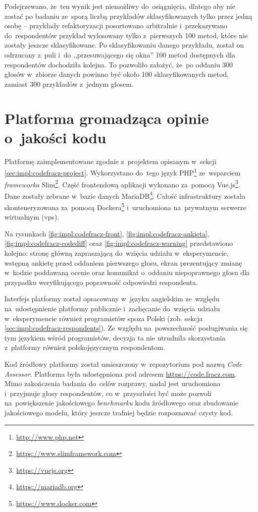\documentclass[twoside]{praca}
\begin{document}
Podejrzewano, że~ten wynik jest niemożliwy do~osiągnięcia, dlatego aby nie zostać po badaniu ze~sporą liczbą przykładów sklasyfikowanych tylko przez jedną osobę -- przykłady refaktoryzacji posortowano arbitralnie i~przekazywano do~respondentów przykład wylosowany tylko z~pierwszych 100 metod, które nie zostały jeszcze sklasyfikowane. Po sklasyfikowaniu danego przykładu, został on odrzucany z~puli i~do ,,przesuwającego się okna'' 100 metod dostępnych dla respondentów dochodziła kolejna. To pozwoliło założyć, że~po oddaniu 300 głosów w~zbiorze danych powinno być około 100 sklasyfikowanych metod, zamiast 300 przykładów z~jednym głosem.

\section{Platforma gromadząca opinie o~jakości kodu}

Platformę zaimplementowane zgodnie z~projektem opisanym w~sekcji \ref{sec:impl:codefracz-project}. Wykorzystano do~tego język PHP\footnote{\url{http://www.php.net}} ze~wsparciem \textit{frameworka} Slim\footnote{\url{https://www.slimframework.com}}. Część frontendową aplikacji wykonano za~pomocą Vue.js\footnote{\url{https://vuejs.org}}. Dane zostały zebrane w~bazie danych MariaDB\footnote{\url{https://mariadb.org}}. Całość infrastruktury została skonteneryzowana za~pomocą Dockera\footnote{\url{https://www.docker.com}} i~uruchomiona na~prywatnym serwerze wirtualnym (\gls{vps}).

Na rysunkach \ref{fig:impl:codefracz-front}, \ref{fig:impl:codefracz-ankieta}, \ref{fig:impl:codefracz-codediff} oraz \ref{fig:impl:codefracz-warning} przedstawiono kolejno: stronę główną zapraszającą do~wzięcia udziału w~eksperymencie, wstępną ankietę przed oddaniem pierwszego głosu, ekran prezentujący zmianę w~kodzie poddawaną ocenie oraz komunikat o~oddaniu niepoprawnego głosu dla przypadku weryfikującego poprawność odpowiedzi respondenta.

Interfejs platformy został opracowany w~języku angielskim ze~względu na~udostępnienie platformy publicznie i~zachęcanie do~wzięcia udziału w~eksperymencie również programistów spoza Polski (zob. sekcja \ref{sec:impl:codefracz-respondents}). Ze względu na~powszechność posługiwania się tym językiem wśród programistów, decyzja ta nie utrudniła skorzystania z~platformy również polskojęzycznym respondentom.

Kod źródłowy platformy został umieszczony w~repozytorium \cite{fracz:code-assessor} pod nazwą \textit{Code Assessor}. Platforma była udostępniona pod adresem \url{https://code.fracz.com}. Mimo zakończenia badania do~celów rozprawy, nadal jest uruchomiona i~przyjmuje głosy respondentów, co w~przyszłości być może pozwoli na~powiększenie jakościowego \textit{benchmarku} kodu źródłowego oraz zbudowanie jakościowego modelu, który jeszcze trafniej będzie rozpoznawać czysty kod.
\end{document}
